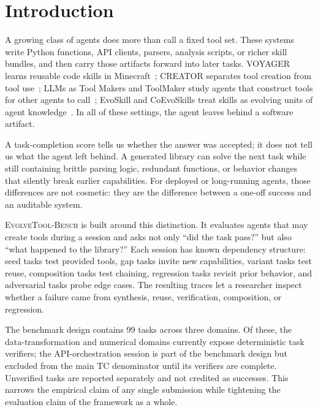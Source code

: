 \documentclass[sigconf,anonymous,review,natbib=false]{acmart}
\begin{document}
\maketitle

\section{Introduction}

A growing class of agents does more than call a fixed tool set. These systems write Python functions, API clients, parsers, analysis scripts, or richer skill bundles, and then carry those artifacts forward into later tasks. VOYAGER learns reusable code skills in Minecraft~\cite{wang2023voyager}; CREATOR separates tool creation from tool use~\cite{qian2023creator}; LLMs as Tool Makers and ToolMaker study agents that construct tools for other agents to call~\cite{cai2023latm,wolflein2025toolmaker}; EvoSkill and CoEvoSkills treat skills as evolving units of agent knowledge~\cite{alzubi2026evoskill,zhang2026coevoskills}. In all of these settings, the agent leaves behind a software artifact.

A task-completion score tells us whether the answer was accepted; it does not tell us what the agent left behind. A generated library can solve the next task while still containing brittle parsing logic, redundant functions, or behavior changes that silently break earlier capabilities. For deployed or long-running agents, those differences are not cosmetic: they are the difference between a one-off success and an auditable system.

\textsc{EvolveTool-Bench} is built around this distinction. It evaluates agents that may create tools during a session and asks not only ``did the task pass?'' but also ``what happened to the library?'' Each session has known dependency structure: seed tasks test provided tools, gap tasks invite new capabilities, variant tasks test reuse, composition tasks test chaining, regression tasks revisit prior behavior, and adversarial tasks probe edge cases. The resulting traces let a researcher inspect whether a failure came from synthesis, reuse, verification, composition, or regression.

The benchmark design contains 99 tasks across three domains. Of these, the data-transformation and numerical domains currently expose deterministic task verifiers; the API-orchestration session is part of the benchmark design but excluded from the main TC denominator until its verifiers are complete. Unverified tasks are reported separately and not credited as successes. This narrows the empirical claim of any single submission while tightening the evaluation claim of the framework as a whole.
\end{document}
